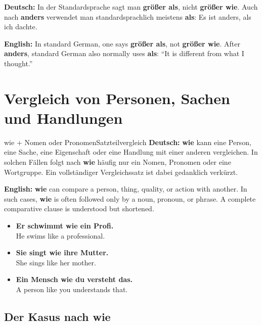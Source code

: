 \documentclass[a4paper,11pt]{article}
\newcommand{\GermanText}[1]{\textbf{Deutsch: }#1\par}
\newcommand{\EnglishText}[1]{{\small\color{SoftGray}\textbf{English: }#1\par}}
\newcommand{\ExampleItem}[2]{\item \textbf{#1}\\{\small\color{SoftGray}#2}}
\begin{document}
\begin{warningbox}
\GermanText{In der Standardsprache sagt man \textbf{größer als}, nicht \textbf{größer wie}. Auch nach \textbf{anders} verwendet man standardsprachlich meistens \textbf{als}: \glqq Es ist anders, als ich dachte.\grqq}
\EnglishText{In standard German, one says \textbf{größer als}, not \textbf{größer wie}. After \textbf{anders}, standard German also normally uses \textbf{als}: ``It is different from what I thought.''}
\end{warningbox}

\section{Vergleich von Personen, Sachen und Handlungen}

\begin{grammarentry}{wie + Nomen oder Pronomen}{Satzteilvergleich}
\GermanText{\textbf{wie} kann eine Person, eine Sache, eine Eigenschaft oder eine Handlung mit einer anderen vergleichen. In solchen Fällen folgt nach \textbf{wie} häufig nur ein Nomen, Pronomen oder eine Wortgruppe. Ein vollständiger Vergleichssatz ist dabei gedanklich verkürzt.}
\EnglishText{\textbf{wie} can compare a person, thing, quality, or action with another. In such cases, \textbf{wie} is often followed only by a noun, pronoun, or phrase. A complete comparative clause is understood but shortened.}
\end{grammarentry}

\begin{exbox}
\begin{itemize}
\ExampleItem{Er schwimmt wie ein Profi.}{He swims like a professional.}
\ExampleItem{Sie singt wie ihre Mutter.}{She sings like her mother.}
\ExampleItem{Ein Mensch wie du versteht das.}{A person like you understands that.}
\end{itemize}
\end{exbox}

\subsection{Der Kasus nach \glqq wie\grqq}
\end{document}
